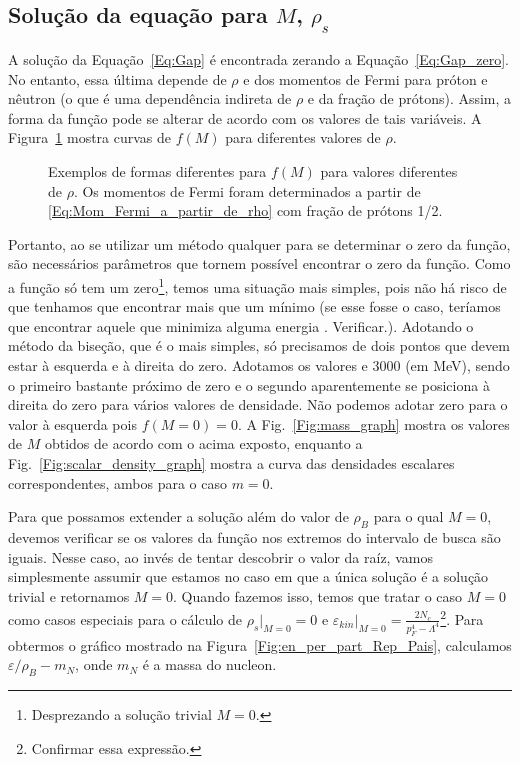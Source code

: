 \subsection{Solução da equação para $M$, $\rho_s$}

A solução da Equação~\eqref{Eq:Gap} é encontrada zerando a Equação~\eqref{Eq:Gap_zero}. No entanto, essa última depende de $\rho$ e dos momentos de Fermi para próton e nêutron (o que é uma dependência indireta de $\rho$ e da fração de prótons). Assim, a forma da função pode se alterar de acordo com os valores de tais variáveis. A Figura~\ref{Fig:Gap_zero_graph} mostra curvas de $f(M)$ para diferentes valores de $\rho$.

\begin{figure}
	
	\caption{Exemplos de formas diferentes para $f(M)$ para valores diferentes de $\rho$. Os momentos de Fermi foram determinados a partir de \eqref{Eq:Mom_Fermi_a_partir_de_rho} com fração de prótons 1/2. \protect}
	\label{Fig:Gap_zero_graph}
\end{figure}

Portanto, ao se utilizar um método qualquer para se determinar o zero da função, são necessários parâmetros que tornem possível encontrar o zero da função. Como a função só tem um zero\footnote[][1cm]{Desprezando a solução trivial $M = 0$.}, temos uma situação mais simples, pois não há risco de que tenhamos que encontrar mais que um mínimo (se esse fosse o caso, teríamos que encontrar aquele que minimiza alguma energia \parencite{Buballa}. Verificar.). Adotando o método da biseção, que é o mais simples, só precisamos de dois pontos que devem estar à esquerda e à direita do zero. Adotamos os valores  e 3000 (em MeV), sendo o primeiro bastante próximo de zero e o segundo aparentemente se posiciona à direita do zero para vários valores de densidade. Não podemos adotar zero para o valor à esquerda pois $f(M=0) = 0$. A Fig.~\ref{Fig:mass_graph} mostra os valores de $M$ obtidos de acordo com o acima exposto, enquanto a Fig.~\ref{Fig:scalar_density_graph} mostra a curva das densidades escalares correspondentes, ambos para o caso $m = 0$.

Para que possamos extender a solução além do valor de $\rho_B$ para o qual $M = 0$, devemos verificar se os valores da função nos extremos do intervalo de busca são iguais. Nesse caso, ao invés de tentar descobrir o valor da raíz, vamos simplesmente assumir que estamos no caso em que a única solução é a solução trivial e retornamos $M = 0$. Quando fazemos isso, temos que tratar o caso $M = 0$ como casos especiais para o cálculo de $\rho_s|_{M=0} = 0$ e $\varepsilon_{kin}|_{M=0} = \frac{2 N_c}{p_F^4 - \Lambda^4}$\footnote{Confirmar essa expressão.}. Para obtermos o gráfico mostrado na Figura~\eqref{Fig:en_per_part_Rep_Pais}, calculamos $\varepsilon / \rho_B - m_N$, onde $m_N$ é a massa do nucleon.

